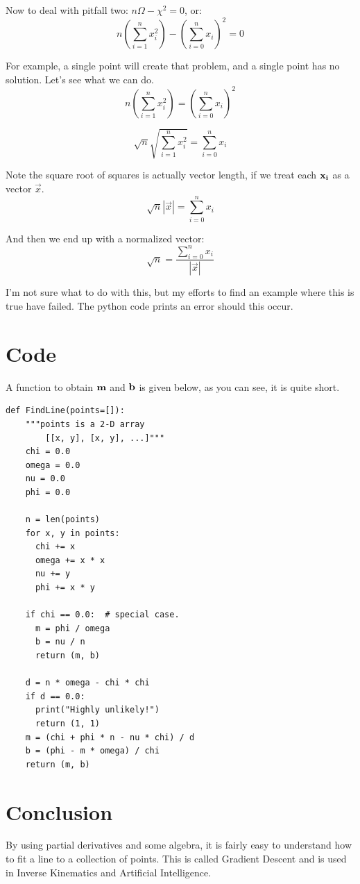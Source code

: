 \documentclass{article}
\begin{document}
Now to deal with pitfall two: $n \Omega - \chi^2 = 0$, or:
\begin{equation}
n  \left( \sum_{i=1}^n x_i^2 \right) - \left( \sum_{i=0}^n x_i \right)^2 = 0
\end{equation}

For example, a single point will create that problem, and a single point
has no solution. Let's see what we can do.
\begin{equation}
n  \left( \sum_{i=1}^n x_i^2 \right) = \left( \sum_{i=0}^n x_i \right)^2
\end{equation}

\begin{equation}
\sqrt{n} \sqrt{ \sum_{i=1}^n x_i^2}  = \sum_{i=0}^n x_i 
\end{equation}

Note the square root of squares is actually vector length, if we treat
each ${\bf x_i}$ as a vector ${\vec{x}}$.
\begin{equation}
\sqrt{n}  \left| \vec{x} \right| =  \sum_{i=0}^n x_i
\end{equation}

And then we end up with a normalized vector:
\begin{equation}
\sqrt{n} = \frac{\sum_{i=0}^n x_i}{\left| \vec{x} \right| }
\end{equation}

I'm not sure what to do with this, but my efforts to find an example
where this is true have failed.  The python code prints an error
should this occur.

\section{Code}
A function to obtain ${\bf m}$ and ${\bf b}$ is given below, as you can see,
it is quite short.
\lstset{language=Python}
\begin{lstlisting}[frame=single]
def FindLine(points=[]):
    """points is a 2-D array
        [[x, y], [x, y], ...]"""
    chi = 0.0
    omega = 0.0
    nu = 0.0
    phi = 0.0

    n = len(points)
    for x, y in points:
      chi += x
      omega += x * x
      nu += y
      phi += x * y

    if chi == 0.0:  # special case.
      m = phi / omega
      b = nu / n
      return (m, b)

    d = n * omega - chi * chi
    if d == 0.0:
      print("Highly unlikely!")
      return (1, 1)
    m = (chi + phi * n - nu * chi) / d
    b = (phi - m * omega) / chi
    return (m, b)
\end{lstlisting}

\section{Conclusion}

By using partial derivatives and some algebra, it is fairly easy to
understand how to fit a line to a collection of points.  This is
called Gradient Descent and is used in Inverse Kinematics and
Artificial Intelligence.
\end{document}
